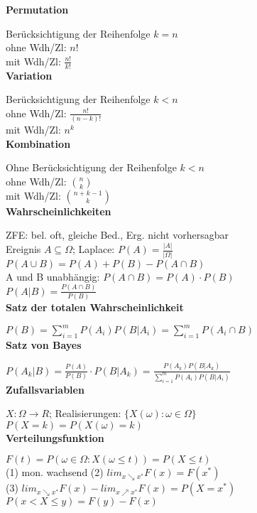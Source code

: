 \documentclass[10pt,twocolumn,a4paper]{article}
\begin{document}
\begin{flushleft}

\textbf{Permutation}

Berücksichtigung der Reihenfolge $k=n$\\
ohne Wdh/Zl: $n!$\\
mit Wdh/Zl: $\frac{n!}{k!}$\\

\textbf{Variation}

Berücksichtigung der Reihenfolge $k < n$\\
ohne Wdh/Zl: $\frac{n!}{(n-k)!}$\\
mit Wdh/Zl: $n^k$\\

\textbf{Kombination}

Ohne Berücksichtigung der Reihenfolge $k < n$\\
ohne Wdh/Zl: $\binom{n}{k}$\\
mit Wdh/Zl: $\binom{n+k-1}{k}$\\

\textbf{Wahrscheinlichkeiten}

ZFE: bel. oft, gleiche Bed., Erg. nicht vorhersagbar\\
Ereignis $A \subseteq \Omega$; Laplace: $P(A) = \frac{|A|}{|\Omega|}$\\

$P(A \cup B) = P(A) + P(B) - P(A \cap B)$\\
A und B unabhängig: $P(A \cap B) = P(A) \cdot P(B)$\\
$P(A|B) = \frac{P(A \cap B)}{P(B)}$\\

\textbf{Satz der totalen Wahrscheinlichkeit}

$P(B) = \sum_{i=1}^m P(A_i) P(B|A_i) = \sum_{i=1}^m P(A_i \cap B)$\\

\textbf{Satz von Bayes}

$P(A_k|B) = \frac{P(A)}{P(B)} \cdot P(B|A_k) = \frac{P(A_k) P(B|A_k)}{\sum_{i=1}^m P(A_i) P(B|A_i)}$\\

\textbf{Zufallsvariablen}

$X: \Omega \rightarrow R$; Realisierungen: $\{ X(\omega) : \omega \in \Omega\}$\\
$P(X=k) = P(X(\omega)=k)$\\

\textbf{Verteilungsfunktion}

$F(t) = P({\omega \in \Omega: X(\omega \leq t)}) = P(X \leq t)$\\
(1) mon. wachsend (2) $lim_{x\searrow x^*}F(x)=F(x^*)$\\
(3) $lim_{x\searrow x^*}F(x)-lim_{x\nearrow x^*}F(x)=P(X=x^*)$\\
$P(x < X \leq y) = F(y) - F(x)$\\


\end{flushleft}
\end{document}
